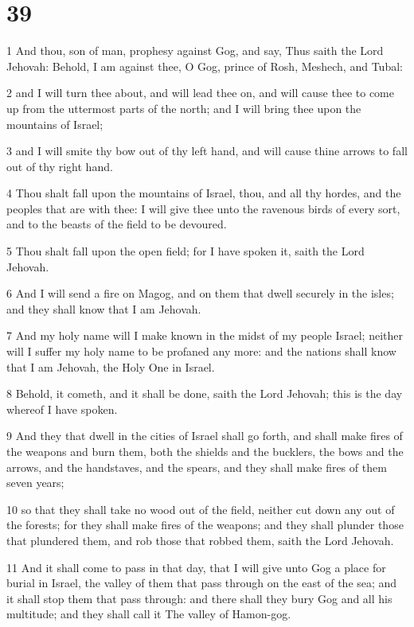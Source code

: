 \chapter{39}

\par 1 And thou, son of man, prophesy against Gog, and say, Thus saith the Lord Jehovah: Behold, I am against thee, O Gog, prince of Rosh, Meshech, and Tubal:
\par 2 and I will turn thee about, and will lead thee on, and will cause thee to come up from the uttermost parts of the north; and I will bring thee upon the mountains of Israel;
\par 3 and I will smite thy bow out of thy left hand, and will cause thine arrows to fall out of thy right hand.
\par 4 Thou shalt fall upon the mountains of Israel, thou, and all thy hordes, and the peoples that are with thee: I will give thee unto the ravenous birds of every sort, and to the beasts of the field to be devoured.
\par 5 Thou shalt fall upon the open field; for I have spoken it, saith the Lord Jehovah.
\par 6 And I will send a fire on Magog, and on them that dwell securely in the isles; and they shall know that I am Jehovah.
\par 7 And my holy name will I make known in the midst of my people Israel; neither will I suffer my holy name to be profaned any more: and the nations shall know that I am Jehovah, the Holy One in Israel.
\par 8 Behold, it cometh, and it shall be done, saith the Lord Jehovah; this is the day whereof I have spoken.
\par 9 And they that dwell in the cities of Israel shall go forth, and shall make fires of the weapons and burn them, both the shields and the bucklers, the bows and the arrows, and the handstaves, and the spears, and they shall make fires of them seven years;
\par 10 so that they shall take no wood out of the field, neither cut down any out of the forests; for they shall make fires of the weapons; and they shall plunder those that plundered them, and rob those that robbed them, saith the Lord Jehovah.
\par 11 And it shall come to pass in that day, that I will give unto Gog a place for burial in Israel, the valley of them that pass through on the east of the sea; and it shall stop them that pass through: and there shall they bury Gog and all his multitude; and they shall call it The valley of Hamon-gog.
